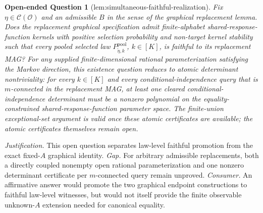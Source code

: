 \documentclass{article}
\newtheorem{openendedquestion}{Open-ended Question}
\begin{document}
\begin{openendedquestion}[lem:simultaneous-faithful-realization]\label{lem:simultaneous-faithful-realization}
Fix \(\eta\in\mathcal C(\mathcal O)\) and an admissible \(B\) in the sense of the graphical replacement lemma. Does the replacement graphical specification admit finite-alphabet shared-response-function kernels with positive selection probability and non-target kernel stability such that every pooled selected law \(P_{\widetilde\eta,k}^{\mathrm{pool}}\), \(k\in[K]\), is faithful to its replacement MAG? For any supplied finite-dimensional rational parameterization satisfying the Markov direction, this existence question reduces to atomic determinant nontriviality: for every \(k\in[K]\) and every conditional-independence query that is \(m\)-connected in the replacement MAG, at least one cleared conditional-independence determinant must be a nonzero polynomial on the equality-constrained shared-response-function parameter space. The finite-union exceptional-set argument is valid once these atomic certificates are available; the atomic certificates themselves remain open.
\end{openendedquestion}
\par\smallskip\noindent \textit{Justification.} This open question separates law-level faithful promotion from the exact fixed-\(A\) graphical identity. \textit{Gap.} For arbitrary admissible replacements, both a directly coupled nonempty open rational parameterization and one nonzero determinant certificate per \(m\)-connected query remain unproved. \textit{Consumer.} An affirmative answer would promote the two graphical endpoint constructions to faithful law-level witnesses, but would not itself provide the finite observable unknown-\(A\) extension needed for canonical equality.
\end{document}
